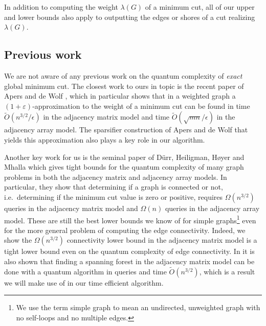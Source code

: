 \documentclass[10pt,a4paper]{article}
\newcommand{\tO}{\tilde O}
\newcommand{\1}{\mathbf{1}}
\theoremstyle{definition}
\begin{document}
In addition to computing the weight $\lambda(G)$ of a minimum cut, all of our upper and lower bounds also apply to outputting the edges or shores of a cut realizing $\lambda(G)$.


\subsection{Previous work}
We are not aware of any previous work on the quantum complexity of \emph{exact} global minimum cut.  The closest work to ours in topic is the recent paper of Apers and de Wolf \cite{AdW19}, which 
in particular shows that in a weighted graph a $(1+\varepsilon)$-approximation to the weight of a minimum cut can be found in time $\tilde O(n^{3/2}/\epsilon)$ in the adjacency matrix model and time 
$\tilde O(\sqrt{mn}/\epsilon)$ in the adjacency array model.  The sparsifier construction of Apers and de Wolf that yields this approximation also plays a key role in our algorithm.  

Another key work for us is the seminal paper of D\"{u}rr, Heiligman, H{\o}yer and Mhalla \cite{DHHM06} which gives tight bounds for the quantum complexity of many graph problems in both the adjacency matrix and adjacency array models.  In particular, 
they show that determining if a graph is connected or not, i.e.\ determining if the minimum cut value is zero or positive, requires $\Omega(n^{3/2})$ queries in the adjacency matrix 
model and $\Omega(n)$ queries in the adjacency array model.  These are still the best lower bounds we know of for simple graphs\footnote{We use the term simple graph to mean an undirected, unweighted 
graph with no self-loops and no multiple edges.} even for the more general problem of computing the edge connectivity. Indeed, 
we show the $\Omega(n^{3/2})$ connectivity lower bound in the adjacency matrix model is a tight lower bound even on the quantum complexity of edge connectivity.
In \cite{DHHM06} it is also shown that finding a spanning forest in the adjacency matrix model can be done with a quantum algorithm in queries and time $\tO(n^{3/2})$, which is a result we will make use of in our time efficient algorithm.
\end{document}
